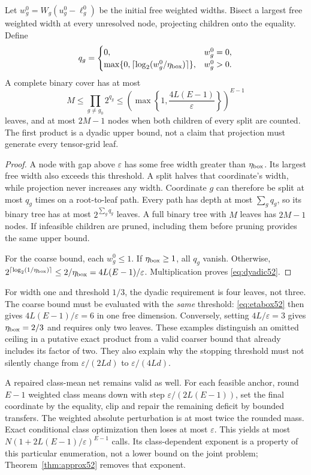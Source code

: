\begin{proposition}\label{prop:dyadic52}
Let $w_g^0=W_g(u_g^0-\ell_g^0)$ be the initial free weighted widths. Bisect a largest free weighted width at every unresolved node, projecting children onto the equality. Define
\[
 q_g=\begin{cases}
 0,&w_g^0=0,\\
 \max\{0,\lceil\log_2(w_g^0/\eta_{\rm box})\rceil\},&w_g^0>0.
 \end{cases}
\]
A complete binary cover has at most
\begin{equation}\label{eq:dyadic52}
 M\leq\prod_{g\ne g_0}2^{q_g}
 \leq\left(\max\left\{1,\frac{4L(E-1)}{\varepsilon}\right\}\right)^{E-1}
\end{equation}
leaves, and at most $2M-1$ nodes when both children of every split are counted. The first product is a dyadic upper bound, not a claim that projection must generate every tensor-grid leaf.
\end{proposition}
\begin{proof}
A node with gap above $\varepsilon$ has some free width greater than $\eta_{\rm box}$. Its largest free width also exceeds this threshold. A split halves that coordinate's width, while projection never increases any width. Coordinate $g$ can therefore be split at most $q_g$ times on a root-to-leaf path. Every path has depth at most $\sum_gq_g$, so its binary tree has at most $2^{\sum_gq_g}$ leaves. A full binary tree with $M$ leaves has $2M-1$ nodes. If infeasible children are pruned, including them before pruning provides the same upper bound.

For the coarse bound, each $w_g^0\leq1$. If $\eta_{\rm box}\geq1$, all $q_g$ vanish. Otherwise, $2^{\lceil\log_2(1/\eta_{\rm box})\rceil}\leq2/\eta_{\rm box}=4L(E-1)/\varepsilon$. Multiplication proves \eqref{eq:dyadic52}.
\end{proof}

For width one and threshold $1/3$, the dyadic requirement is four leaves, not three. The coarse bound must be evaluated with the \emph{same} threshold: \eqref{eq:etabox52} then gives $4L(E-1)/\varepsilon=6$ in one free dimension. Conversely, setting $4L/\varepsilon=3$ gives $\eta_{\rm box}=2/3$ and requires only two leaves. These examples distinguish an omitted ceiling in a putative exact product from a valid coarser bound that already includes its factor of two. They also explain why the stopping threshold must not silently change from $\varepsilon/(2Ld)$ to $\varepsilon/(4Ld)$.

A repaired class-mean net remains valid as well. For each feasible anchor, round $E-1$ weighted class means down with step $\varepsilon/(2L(E-1))$, set the final coordinate by the equality, clip and repair the remaining deficit by bounded transfers. The weighted absolute perturbation is at most twice the rounded mass. Exact conditional class optimization then loses at most $\varepsilon$. This yields at most $N(1+2L(E-1)/\varepsilon)^{E-1}$ calls. Its class-dependent exponent is a property of this particular enumeration, not a lower bound on the joint problem; Theorem~\ref{thm:approx52} removes that exponent.
